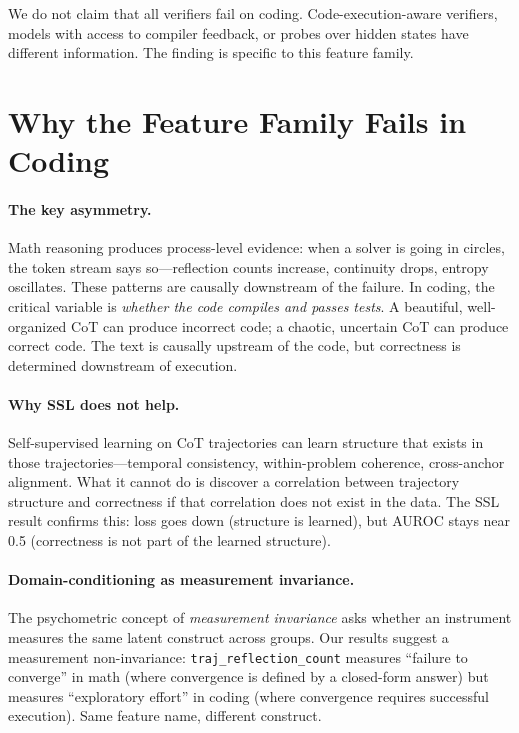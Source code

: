 \documentclass{article}
\begin{document}
We do not claim that all verifiers fail on coding. Code-execution-aware verifiers, models with access to compiler feedback, or probes over hidden states have different information. The finding is specific to this feature family.

\section{Why the Feature Family Fails in Coding}
\label{sec:why}

\paragraph{The key asymmetry.} Math reasoning produces process-level evidence: when a solver is going in circles, the token stream says so---reflection counts increase, continuity drops, entropy oscillates. These patterns are causally downstream of the failure. In coding, the critical variable is \emph{whether the code compiles and passes tests}. A beautiful, well-organized CoT can produce incorrect code; a chaotic, uncertain CoT can produce correct code. The text is causally upstream of the code, but correctness is determined downstream of execution.

\paragraph{Why SSL does not help.} Self-supervised learning on CoT trajectories can learn structure that exists in those trajectories---temporal consistency, within-problem coherence, cross-anchor alignment. What it cannot do is discover a correlation between trajectory structure and correctness if that correlation does not exist in the data. The SSL result confirms this: loss goes down (structure is learned), but AUROC stays near 0.5 (correctness is not part of the learned structure).

\paragraph{Domain-conditioning as measurement invariance.} The psychometric concept of \emph{measurement invariance} \citep{vandenberg2000review} asks whether an instrument measures the same latent construct across groups. Our results suggest a measurement non-invariance: \texttt{traj\_reflection\_count} measures ``failure to converge'' in math (where convergence is defined by a closed-form answer) but measures ``exploratory effort'' in coding (where convergence requires successful execution). Same feature name, different construct.
\end{document}
